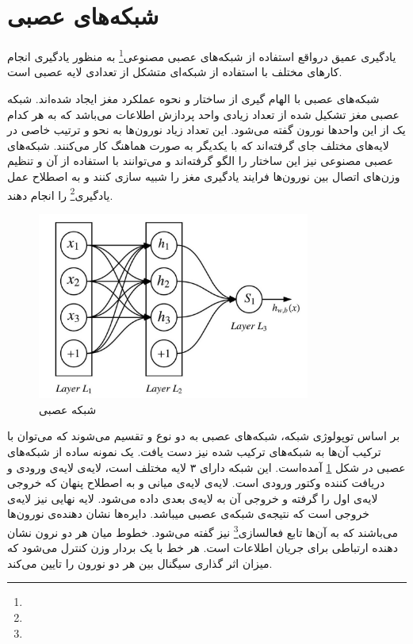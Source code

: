 \documentclass[12pt, a4paper, oneside]{report}
\begin{document}
\section{شبکه‌های عصبی}

یادگیری عمیق درواقع استفاده از 
شبکه‌های عصبی مصنوعی\footnote{}
به منظور یادگیری انجام کارهای مختلف
با استفاده از شبکه‌ای متشکل از تعدادی لایه عصبی است.

شبکه‌های عصبی با الهام گیری از ساختار و نحوه عملکرد مغز ایجاد شده‌اند. شبکه عصبی مغز تشکیل شده
از تعداد زیادی واحد پردازش اطلاعات می‌باشد که به هر کدام یک از این واحدها نورون گفته می‌شود.
این تعداد زیاد نورون‌ها به نحو و ترتیب خاصی در لایه‌های مختلف جای گرفته‌اند که با یکدیگر به صورت
هماهنگ کار می‌کنند. شبکه‌های عصبی مصنوعی نیز این ساختار را الگو گرفته‌اند و می‌توانند با استفاده از آن‌
و تنظیم وزن‌های اتصال بین نورون‌ها فرایند یادگیری مغز را شبیه سازی کنند و به اصطلاح عمل
یادگیری\footnote{}
را انجام دهند.

\begin{figure}[!ht]
    \centering
    \includegraphics[width=0.80\textwidth]{FFNN}
    \caption{شبکه عصبی }
    \label{fig:ffnn}
\end{figure}

بر اساس توپولوژی شبکه، شبکه‌های عصبی به دو نوع 
و
تقسیم می‌شوند که می‌توان با ترکیب آن‌ها به شبکه‌های ترکیب شده نیز دست یافت.
یک نمونه ساده از شبکه‌های عصبی
در شکل
\ref{fig:ffnn}
آمده‌است. این شبکه دارای ۳ لایه مختلف است، لایه‌ی
لایه‌ی ورودی و دریافت کننده وکتور ورودی است. لایه‌ی
لایه‌ی میانی و به اصطلاح پنهان که خروجی لایه‌ی اول را گرفته و خروجی آن به لایه‌ی بعدی داده می‌شود. لایه نهایی نیز لایه‌ی
خروجی است که نتیجه‌ی شبکه‌ی عصبی میباشد.
دایره‌ها نشان دهنده‌ی نورون‌ها می‌باشند که به آن‌ها
تابع فعالسازی\footnote{}
نیز گفته می‌شود. خطوط میان هر دو نرون نشان دهنده ارتباطی برای جریان اطلاعات است. هر خط با یک بردار وزن کنترل می‌شود
که میزان اثر گذاری سیگنال بین هر دو نورون را تایین می‌کند.
\end{document}
